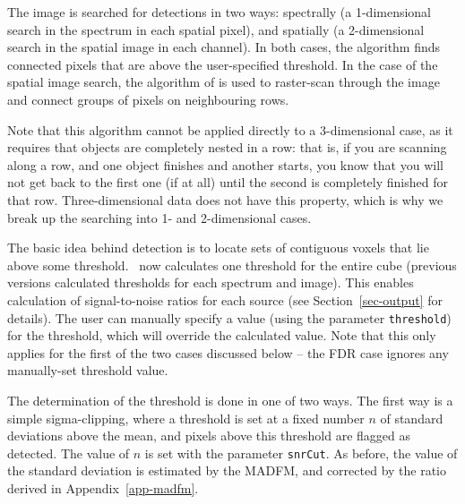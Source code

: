 \label{sec-detection}

The image is searched for detections in two ways: spectrally (a
1-dimensional search in the spectrum in each spatial pixel), and
spatially (a 2-dimensional search in the spatial image in each
channel). In both cases, the algorithm finds connected pixels that are
above the user-specified threshold. In the case of the spatial image
search, the algorithm of \citet{lutz80} is used to raster-scan through
the image and connect groups of pixels on neighbouring rows.

Note that this algorithm cannot be applied directly to a 3-dimensional
case, as it requires that objects are completely nested in a row: that
is, if you are scanning along a row, and one object finishes and
another starts, you know that you will not get back to the first one
(if at all) until the second is completely finished for that
row. Three-dimensional data does not have this property, which is why
we break up the searching into 1- and 2-dimensional cases.

The basic idea behind detection is to locate sets of contiguous voxels
that lie above some threshold. \duchamp\ now calculates one threshold
for the entire cube (previous versions calculated thresholds for each
spectrum and image). This enables calculation of signal-to-noise
ratios for each source (see Section~\ref{sec-output} for details). The
user can manually specify a value (using the parameter
\texttt{threshold}) for the threshold, which will override the
calculated value. Note that this only applies for the first of the two
cases discussed below -- the FDR case ignores any manually-set
threshold value.

The determination of the threshold is done in one of two ways. The
first way is a simple sigma-clipping, where a threshold is set at a
fixed number $n$ of standard deviations above the mean, and pixels
above this threshold are flagged as detected. The value of $n$ is set
with the parameter \texttt{snrCut}. As before, the value of the
standard deviation is estimated by the MADFM, and corrected by the
ratio derived in Appendix~\ref{app-madfm}.

